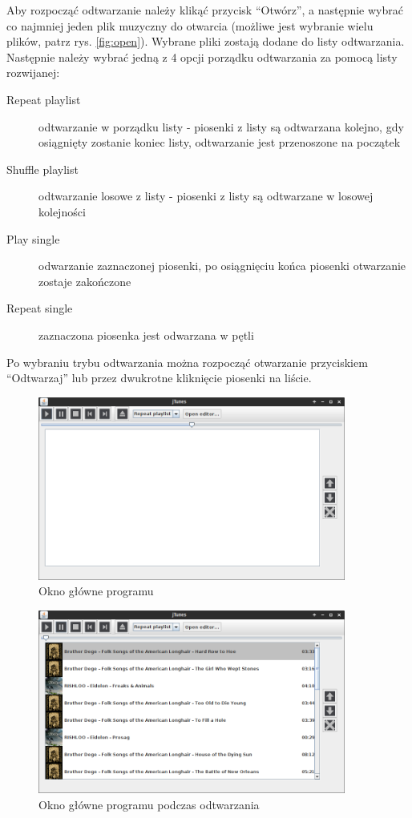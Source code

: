 \documentclass[12pt,a4paper,notitlepage]{article}
\begin{document}
Aby rozpocząć odtwarzanie należy klikąć przycisk ``Otwórz'', a następnie wybrać co najmniej jeden plik muzyczny do otwarcia (możliwe jest wybranie wielu plików, patrz rys. \ref{fig:open}).
Wybrane pliki zostają dodane do listy odtwarzania. Następnie należy wybrać jedną z 4 opcji porządku odtwarzania za pomocą listy rozwijanej:
\begin{description}
 \item[Repeat playlist] odtwarzanie w porządku listy - piosenki z listy są odtwarzana kolejno, gdy osiągnięty zostanie koniec listy, odtwarzanie jest przenoszone na początek
 \item[Shuffle playlist] odtwarzanie losowe z listy - piosenki z listy są odtwarzane w losowej kolejności
 \item[Play single] odwarzanie zaznaczonej piosenki, po osiągnięciu końca piosenki otwarzanie zostaje zakończone
 \item[Repeat single] zaznaczona piosenka jest odwarzana w pętli
\end{description}
Po wybraniu trybu odtwarzania można rozpocząć otwarzanie przyciskiem ``Odtwarzaj'' lub przez dwukrotne kliknięcie piosenki na liście.



\begin{figure}[hb]
 \centering
 \includegraphics[width=0.9\textwidth]{img/player_blank.png}
 \caption{Okno główne programu}
 \label{fig:player_blank}
\end{figure}


\begin{figure}[hb]
 \centering
 \includegraphics[width=0.9\textwidth]{img/player_playing.png}
 \caption{Okno główne programu podczas odtwarzania}
 \label{fig:player_playing}
\end{figure}
\end{document}
